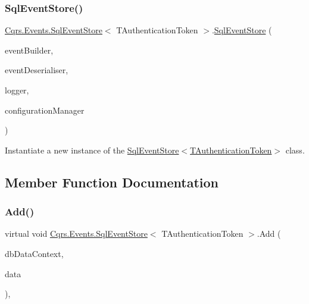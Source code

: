 \subsubsection{\texorpdfstring{Sql\+Event\+Store()}{SqlEventStore()}}
{\footnotesize\ttfamily \hyperlink{classCqrs_1_1Events_1_1SqlEventStore}{Cqrs.\+Events.\+Sql\+Event\+Store}$<$ T\+Authentication\+Token $>$.\hyperlink{classCqrs_1_1Events_1_1SqlEventStore}{Sql\+Event\+Store} (\begin{DoxyParamCaption}\item[{\hyperlink{interfaceCqrs_1_1Events_1_1IEventBuilder}{I\+Event\+Builder}$<$ T\+Authentication\+Token $>$}]{event\+Builder,  }\item[{\hyperlink{interfaceCqrs_1_1Events_1_1IEventDeserialiser}{I\+Event\+Deserialiser}$<$ T\+Authentication\+Token $>$}]{event\+Deserialiser,  }\item[{I\+Logger}]{logger,  }\item[{\hyperlink{interfaceCqrs_1_1Configuration_1_1IConfigurationManager}{I\+Configuration\+Manager}}]{configuration\+Manager }\end{DoxyParamCaption})}



Instantiate a new instance of the \hyperlink{classCqrs_1_1Events_1_1SqlEventStore_a15df78a1b12d2e3035b9715e9bfc8535_a15df78a1b12d2e3035b9715e9bfc8535}{Sql\+Event\+Store$<$\+T\+Authentication\+Token$>$} class. 



\subsection{Member Function Documentation}
\mbox{\label{classCqrs_1_1Events_1_1SqlEventStore_a94ce64c00db57e5b9dbd10f74a4cef5b_a94ce64c00db57e5b9dbd10f74a4cef5b}} 
\subsubsection{\texorpdfstring{Add()}{Add()}}
{\footnotesize\ttfamily virtual void \hyperlink{classCqrs_1_1Events_1_1SqlEventStore}{Cqrs.\+Events.\+Sql\+Event\+Store}$<$ T\+Authentication\+Token $>$.Add (\begin{DoxyParamCaption}\item[{Data\+Context}]{db\+Data\+Context,  }\item[{\hyperlink{classCqrs_1_1Events_1_1EventData}{Event\+Data}}]{data }\end{DoxyParamCaption})\hspace{0.3cm}{\ttfamily [protected]}, {\ttfamily [virtual]}}

